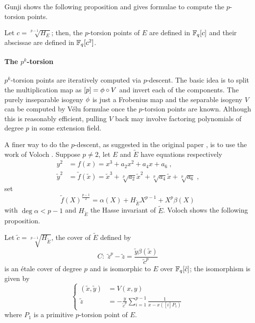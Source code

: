 Gunji shows the following proposition and gives formulae to compute
the $p$-torsion points.

\begin{proposition}
  \label{th:gunji}
  Let $c=\sqrt[p-1]{H_E}$; then, the $p$-torsion points of $E$ are
  defined in $\mathbb{F}_q[c]$ and their abscissae are defined in $\mathbb{F}_q[c^2]$.
\end{proposition}


\paragraph{The $p^k$-torsion}
$p^k$-torsion points are iteratively computed via $p$-descent. The
basic idea is to split the multiplication map as $[p] = \phi\circ
V$ and invert each of the components. The purely inseparable isogeny
$\phi$ is just a Frobenius map and the separable isogeny $V$ can
be computed by Vélu formulae once the $p$-torsion points are
known. Although this is reasonably efficient, pulling $V$ back may
involve factoring polynomials of degree $p$ in some extension field.

A finer way to do the $p$-descent, as suggested in the original paper
\cite{Cou96}, is to use the work of Voloch \cite{Vol90}. Suppose
$p\ne2$, let $E$ and $\widetilde{E}$ have equations respectively
\begin{align*}
  y^2&=f(x)=x^3+a_2x^2+a_4x+a_6 \;\text{,}\\
  \tilde{y}^2&=\tilde{f}(\tilde{x}) = \tilde{x}^3 +
  \sqrt[p]{a_2}\tilde{x}^2 + \sqrt[p]{a_4}\tilde{x} + \sqrt[p]{a_6}
  \;\text{,}
\end{align*}
set
 \begin{equation}
  \label{eq:voloch:cover}
  \tilde{f}(X)^{\frac{p-1}{2}} = \alpha(X) + H_{\widetilde{E}}X^{p-1} + X^p\beta(X)
\end{equation}
with $\deg \alpha < p-1$ and $H_{\widetilde{E}}$ the Hasse invariant
of $\widetilde{E}$. Voloch shows the following proposition.

\begin{proposition}
  \label{th:voloch}
  Let $\tilde{c} = \sqrt[p-1]{H_{\widetilde{E}}}$, the cover of
  $\widetilde{E}$ defined by
  \begin{equation}
    \label{th:voloch:cover}
    C:\; \tilde{z}^p - \tilde{z} = \frac{\tilde{y}\beta(\tilde{x})}{\tilde{c}^p}
  \end{equation}
  is an étale cover of degree $p$ and is isomorphic to $E$ over
  $\mathbb{F}_q[\tilde{c}]$; the isomorphism is given by
  \begin{equation}
    \label{th:voloch:isom}
    \left\{
      \begin{aligned}
        (\tilde{x}, \tilde{y}) &= V(x, y)\\
        \tilde{z} &= -\frac{y}{\tilde{c}^p}\sum_{i=1}^{p-1}\frac{1}{x - x([i]P_1)}
      \end{aligned}
    \right.
  \end{equation}
  where $P_1$ is a primitive $p$-torsion point of $E$.
\end{proposition}

